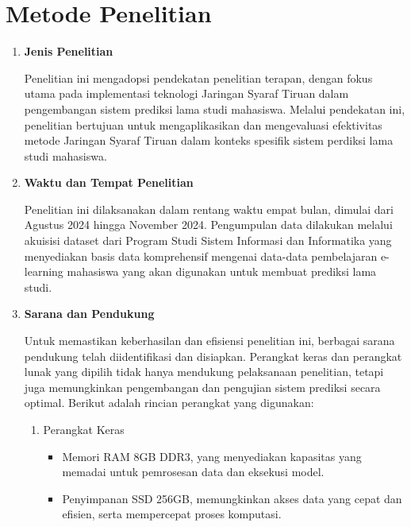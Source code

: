 \section{Metode Penelitian}

\begin{enumerate}
    \item \textbf{Jenis Penelitian}
    
    Penelitian ini mengadopsi pendekatan penelitian terapan, dengan fokus utama pada implementasi teknologi Jaringan Syaraf Tiruan dalam pengembangan sistem prediksi lama studi mahasiswa. Melalui pendekatan ini, penelitian bertujuan untuk mengaplikasikan dan mengevaluasi efektivitas metode Jaringan Syaraf Tiruan dalam konteks spesifik sistem perdiksi lama studi mahasiswa.

    \item \textbf{Waktu dan Tempat Penelitian}
    
    Penelitian ini dilaksanakan dalam rentang waktu empat bulan, dimulai dari Agustus 2024 hingga November 2024. Pengumpulan data dilakukan melalui akuisisi dataset dari Program Studi Sistem Informasi dan Informatika yang menyediakan basis data komprehensif mengenai data-data pembelajaran e-learning mahasiswa yang akan digunakan untuk membuat prediksi lama studi.

    \item \textbf{Sarana dan Pendukung}
    
    Untuk memastikan keberhasilan dan efisiensi penelitian ini, berbagai sarana pendukung telah diidentifikasi dan disiapkan. Perangkat keras dan perangkat lunak yang dipilih tidak hanya mendukung pelaksanaan penelitian, tetapi juga memungkinkan pengembangan dan pengujian sistem prediksi secara optimal. Berikut adalah rincian perangkat yang digunakan:

    \begin{enumerate}
        \item Perangkat Keras
        \begin{itemize}
            \item Memori RAM 8GB DDR3, yang menyediakan kapasitas yang memadai untuk pemrosesan data dan eksekusi model.
            \item Penyimpanan SSD 256GB, memungkinkan akses data yang cepat dan efisien, serta mempercepat proses komputasi.
        \end{itemize}


\end{enumerate}
\end{enumerate}
